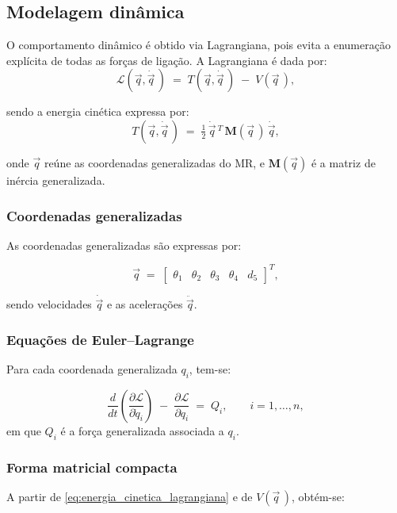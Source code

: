 \subsection{Modelagem dinâmica}
\label{sec:MR_modelagem_dinamica}
O comportamento dinâmico é obtido via Lagrangiana, pois evita a enumeração explícita de todas as forças de ligação.
A Lagrangiana é dada por:
\begin{equation}
\mathcal{L}(\vec q,\dot{\vec q}\,) \;=\; T(\vec q,\dot{\vec q}\,) \;-\; V(\vec q\,),
\end{equation}

sendo a energia cinética expressa por:
\begin{equation}
\label{eq:energia_cinetica_lagrangiana}
T(\vec q,\dot{\vec q}\,)
\;=\;
\tfrac12\,\dot{\vec q}\,^T\,\mathbf M(\vec q\,)\,\dot{\vec q},
\end{equation}

onde $\vec q$ reúne as coordenadas generalizadas do MR, e $\mathbf M(\vec q)$ é a matriz de inércia generalizada.

\subsubsection{Coordenadas generalizadas}
As coordenadas generalizadas são expressas por:

\begin{equation}
\vec q
\;=\;
\begin{bmatrix}\theta_1 & \theta_2 & \theta_3 & \theta_4 & d_5\end{bmatrix}^T,
\end{equation}

sendo velocidades $\dot{\vec q}$ e
as acelerações $\ddot{\vec q}$.

\subsubsection{Equações de Euler--Lagrange}
Para cada coordenada generalizada $q_i$, tem-se:

\begin{equation}
\frac{d}{dt}\!\left(\frac{\partial \mathcal L}{\partial \dot q_i}\right)
\;-\; \frac{\partial \mathcal L}{\partial q_i}
\;=\;
Q_i, \qquad i=1,\dots,n,
\label{eq:EL_componentes}
\end{equation}
em que $Q_i$ é a força generalizada associada a $q_i$.

\subsubsection{Forma matricial compacta}
A partir de \eqref{eq:energia_cinetica_lagrangiana} e de $V(\vec q\, )$, obtém-se:

